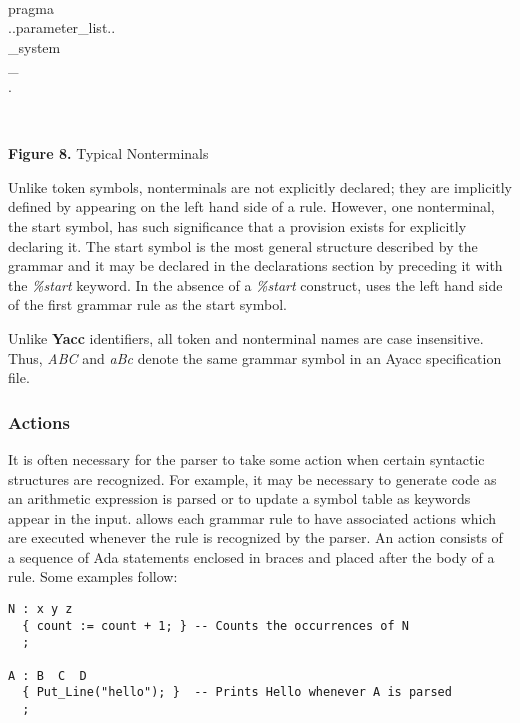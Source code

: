 \noindent\hspace{-0.05in}\hrulefill\hspace{0.0in}\\
\vspace{-0.2in}
\begin{center}
pragma\\
..parameter\_list..\\
\_system\\
\_\\
.\\
\end{center}
\hspace{-0.05in}\hrulefill\hspace{0.0in}\\
\centerline{{\bf Figure 8.} Typical Nonterminals}
Unlike token symbols, nonterminals are not explicitly declared;
they are  implicitly defined by appearing on the left hand side
of a rule.  However, one nonterminal, the start symbol, has
such significance that a provision exists for explicitly
declaring it.  The start symbol is the most general
structure described by the grammar and it may be declared in
the declarations section by preceding it with the
{\it \%start}
keyword.  In the absence of a
{\it \%start}
construct, \ayacc
uses the left hand side of the first grammar rule as
the start symbol.

Unlike {\bf Yacc} identifiers, all token and nonterminal names
are case insensitive.  Thus,
{\it ABC}
and
{\it aBc}
denote the same
grammar symbol in an Ayacc specification file.
\subsubsection{Actions}
It is often necessary for the parser to take some action
when certain syntactic structures are recognized.  For example,
it may be necessary to generate code as an
arithmetic expression is parsed or to update a symbol
table as keywords appear in the input.  \ayacc allows each grammar
rule to have associated actions
which are executed whenever the rule is recognized by the
parser.  An action consists of a sequence of Ada statements
enclosed in braces and placed after the body of a rule.  Some
examples follow:
\begin{verbatim}
N : x y z
  { count := count + 1; } -- Counts the occurrences of N
  ;

A : B  C  D
  { Put_Line("hello"); }  -- Prints Hello whenever A is parsed
  ;
\end{verbatim}

